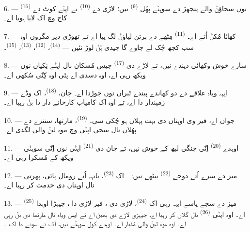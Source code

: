 6. ---  \textsuperscript{(16)} نوں سجاؤݨ والے پتجھڑ دے سوہݨے پھُل
 \textsuperscript{(9)} نیں؛ لاڑی دے 
\textsuperscript{(10)} نے اپݨے کوٹ دے کاج وچ اک لایا ہویا اے۔

7. --- کھاݨا مُکݨ اُتے اے۔  \textsuperscript{(11)} مِٹھے دے برتن
لیاؤݨ لگ پیا اے تے تھوڑی دیر مگروں اوہ سب کجھ چُک لے جاوے گا جیدی ہُݨ لوڑ نئیں
—  \textsuperscript{(14)}،  \textsuperscript{(12)}،
 \textsuperscript{(13)}، 
\textsuperscript{(15)}۔

\VUsaut{3.0mm}

8. --- سارے خوش وکھائی دیندے نیں، تے لاڑے دی  \textsuperscript{(17)}
جیس مُسکان نال اپݨے نِکیاں نوں ویکھ رہی اے، اوہ دسدی اے پئی اوہ کِنّی سُکھی اے۔

9. --- ایہہ ویاہ علاقے دے دو کھاندے پیندے ٹبراں نوں جوڑدا اے۔ جان،
 \textsuperscript{(18)}، اک وڈے زمیندار دا  اے، تے
اوہ اک کامیاب کارخانے دار دا  بݨ رہیا اے۔

10. ---  جوان اے، فیر وی اوہناں دی  بہت پہلاں ہو
چُکی سی۔  \textsuperscript{(19)}، مارتھا، سنترے دے پھُلاں نال
سجی اپݨی  وچ موہ لیݨ والی لگدی اے۔

11. --- اوہدے  \textsuperscript{(20)} اِنّی چنگی 
لبھ کے خوش نیں، تے جان دی  \textsuperscript{(21)} اپݨی 
نوں اِنّی سوہݨی ویکھ کے مُسکرا رہی اے۔

12. --- میز دے سرے اُتے دوجے  \textsuperscript{(22)} بیٹھے نیں:
۔ اک  \textsuperscript{(23)}،
بانہہ اُتے رومال پائی، پھرتی نال اوہناں دی خدمت کر رہیا اے۔

\VUsaut{3.0mm}

13. --- میز دے سجے پاسے ایہہ رہی اک  \textsuperscript{(24)}، لاڑی
دی ، فیر لاڑی دا ، جیہڑا اوہدا 
\textsuperscript{(25)} اے۔ اوہ اپݨی  \textsuperscript{(26)} نال گلاں
کر رہیا اے، جیہڑی لاڑے دی بھین اے تے ایس ویاہ نال مارتھا دی  بݨ
رہی اے۔ اوہ موہ لیݨ والی مُٹیار اے۔ اوہدے کول سوہݨے  نیں، اک
 تے سونے دا اک ۔

